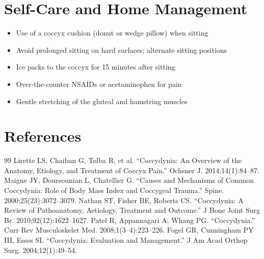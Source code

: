 \section*{Self-Care and Home Management}
\begin{itemize}
  \item Use of a coccyx cushion (donut or wedge pillow) when sitting
  \item Avoid prolonged sitting on hard surfaces; alternate sitting positions
  \item Ice packs to the coccyx for 15 minutes after sitting
  \item Over-the-counter NSAIDs or acetaminophen for pain
  \item Gentle stretching of the gluteal and hamstring muscles
\end{itemize}

\section*{References}
\begin{thebibliography}{99}
 Lirette LS, Chaiban G, Tolba R, et al. ``Coccydynia: An Overview of the Anatomy, Etiology, and Treatment of Coccyx Pain.'' Ochsner J. 2014;14(1):84--87.
 Maigne JY, Doursounian L, Chatellier G. ``Causes and Mechanisms of Common Coccydynia: Role of Body Mass Index and Coccygeal Trauma.'' Spine. 2000;25(23):3072--3079.
 Nathan ST, Fisher BE, Roberts CS. ``Coccydynia: A Review of Pathoanatomy, Aetiology, Treatment and Outcome.'' J Bone Joint Surg Br. 2010;92(12):1622--1627.
 Patel R, Appannagari A, Whang PG. ``Coccydynia.'' Curr Rev Musculoskelet Med. 2008;1(3--4):223--226.
 Fogel GR, Cunningham PY III, Esses SI. ``Coccydynia: Evaluation and Management.'' J Am Acad Orthop Surg. 2004;12(1):49--54.
\end{thebibliography}
